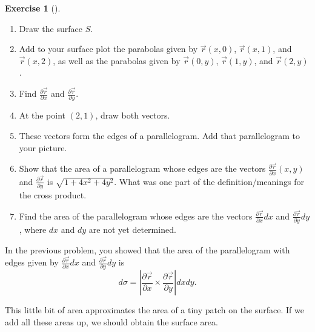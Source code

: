 \documentclass[10pt,]{book}
\theoremstyle{plain}
\theoremstyle{definition}
\theoremstyle{definition}
\theoremstyle{definition}
\theoremstyle{definition}
\newtheorem{exploration}[project]{Exercise}
\theoremstyle{definition}
\numberwithin{equation}{section}
\newcommand{\ds}{\displaystyle}
\begin{document}
\begin{exploration}[]\label{exploration-275}
\leavevmode%
\begin{enumerate}[font=\bfseries,label=(\alph*),ref=\alph*]
\item\label{task-742} Draw the surface \(S\).%
\item\label{task-743} Add to your surface plot the parabolas given by \(\vec r(x,0)\), \(\vec r(x,1)\), and \(\vec r(x,2)\), as well as the parabolas given by \(\vec r(0,y)\), \(\vec r(1,y)\), and \(\vec r(2,y)\).%
\item\label{task-744} Find \(\ds \frac{\partial \vec r}{\partial x}\) and \(\ds\frac{\partial \vec r}{\partial y}\).%
\item\label{task-745} At the point \((2,1)\), draw both vectors.%
\item\label{task-746} These vectors form the edges of a parallelogram. Add that parallelogram to your picture.%
\item\label{task-747} Show that the area of a parallelogram whose edges are the vectors \(\ds\frac{\partial \vec r}{\partial x}(x,y)\) and \(\ds\frac{\partial \vec r}{\partial y}\) is \(\sqrt{1+4x^2+4y^2}\). What was one part of the definition/meanings for the cross product.%
%
\item\label{task-748} Find the area of the parallelogram whose edges are the vectors \(\ds\frac{\partial \vec r}{\partial x}dx\) and \(\ds\frac{\partial \vec r}{\partial y}dy\), where \(dx\) and \(dy\) are not yet determined.%
\end{enumerate}
\end{exploration}
In the previous problem, you showed that the area of the parallelogram with edges given by \(\frac{\partial \vec r}{\partial x}dx\) and \(\frac{\partial \vec r}{\partial y}dy\) is%
\begin{equation*}
d\sigma =\left |\frac{\partial \vec r}{\partial x} \times \frac{\partial \vec r}{\partial y}\right| dxdy.
\end{equation*}
%
\par
This little bit of area approximates the area of a tiny patch on the surface. If we add all these areas up, we should obtain the surface area.%
\end{document}
